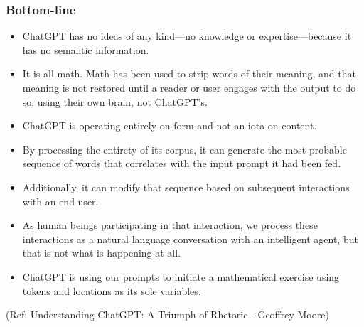 \begin{frame}[fragile]\frametitle{Bottom-line}

\begin{itemize}
\item ChatGPT has no ideas of any kind—no knowledge or expertise—because it has no semantic information. 
\item It is all math. Math has been used to strip words of their meaning, and that meaning is not restored until a reader or user engages with the output to do so, using their own brain, not ChatGPT’s. 
\item ChatGPT is operating entirely on form and not an iota on content. 
\item By processing the entirety of its corpus, it can generate the most probable sequence of words that correlates with the input prompt it had been fed. 
\item Additionally, it can modify that sequence based on subsequent interactions with an end user. 
\item As human beings participating in that interaction, we process these interactions as a natural language conversation with an intelligent agent, but that is not what is happening at all. 
\item ChatGPT is using our prompts to initiate a mathematical exercise using tokens and locations as its sole variables. 
\end{itemize}


{\tiny (Ref: Understanding ChatGPT: A Triumph of Rhetoric - Geoffrey Moore)}

\end{frame}